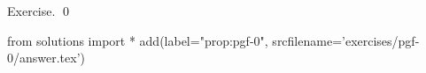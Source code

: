
\begin{prop}
  \label{prop:pgf-0}
  
\end{prop}
\proof
Exercise.
\qed
\begin{python0}
from solutions import *
add(label="prop:pgf-0",
    srcfilename='exercises/pgf-0/answer.tex') 
\end{python0}
